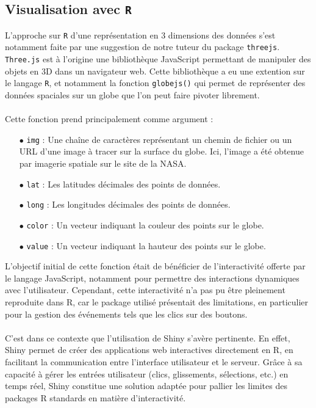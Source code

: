\documentclass[12pt]{article}
\begin{document}
\subsection{Visualisation avec \texttt{R}}

L'approche sur \texttt{R} d'une représentation en 3 dimensions des données s'est notamment faite par une suggestion de notre tuteur du package \texttt{threejs}. \texttt{Three.js} est à l'origine une bibliothèque JavaScript permettant de manipuler des objets en 3D dans un navigateur web. Cette bibliothèque a eu une extention sur le langage \texttt{R}, et notamment la fonction \texttt{globejs()} qui permet de représenter des données spaciales sur un globe que l'on peut faire pivoter librement.\\
\\
Cette fonction prend principalement comme argument :\\
\begin{itemize}
    \item[$\bullet$] \texttt{img} : Une chaîne de caractères représentant un chemin de fichier ou un URL d'une image à tracer sur la surface du globe. Ici, l'image a été obtenue par imagerie spatiale sur le site de la NASA.
    \item[$\bullet$] \texttt{lat} : Les latitudes décimales des points de données.
    \item[$\bullet$] \texttt{long} : Les longitudes décimales des points de données.
    \item[$\bullet$] \texttt{color} : Un vecteur indiquant la couleur des points sur le globe.
    \item[$\bullet$] \texttt{value} : Un vecteur indiquant la hauteur des points sur le globe.\\
\end{itemize}
\vspace{0.3cm}
L’objectif initial de cette fonction était de bénéficier de l’interactivité offerte par le langage JavaScript, notamment pour permettre des interactions dynamiques avec l’utilisateur. Cependant, cette interactivité n’a pas pu être pleinement reproduite dans R, car le package utilisé présentait des limitations, en particulier pour la gestion des événements tels que les clics sur des boutons.\\
\\
C’est dans ce contexte que l’utilisation de Shiny s’avère pertinente. En effet, Shiny permet de créer des applications web interactives directement en R, en facilitant la communication entre l’interface utilisateur et le serveur. Grâce à sa capacité à gérer les entrées utilisateur (clics, glissements, sélections, etc.) en temps réel, Shiny constitue une solution adaptée pour pallier les limites des packages R standards en matière d’interactivité.\\
\end{document}

